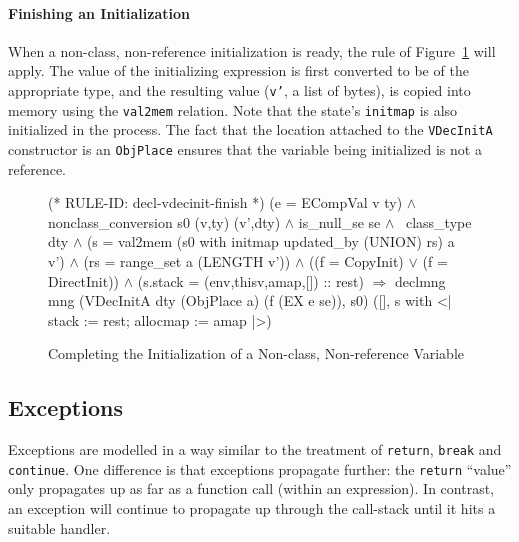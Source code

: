 \documentclass[11pt]{article}
\begin{document}
\paragraph{Finishing an Initialization}
When a non-class, non-reference initialization is ready, the rule
 of Figure~\ref{fig:decl-vdecinit-finish}
will apply.  The value of the initializing expression is first
converted to be of the appropriate type, and the resulting value
(\texttt{v'}, a list of bytes), is copied into memory using the
\texttt{val2mem}%
%
relation.  Note that the state's \texttt{initmap} is also initialized
in the process.  The fact that the location attached to the
\texttt{VDecInitA} constructor is an \texttt{ObjPlace} ensures that
the variable being initialized is not a reference.%
%
\begin{figure}
%
%
\begin{stdrule}
(* RULE-ID: decl-vdecinit-finish *)
     (e = ECompVal v ty) \(\land\)
     nonclass_conversion s0 (v,ty) (v',dty) \(\land\)
     is_null_se se \(\land\)
     ~class_type dty \(\land\)
     (s = val2mem (s0 with initmap updated_by (UNION) rs) a v') \(\land\)
     (rs = range_set a (LENGTH v')) \(\land\)
     ((f = CopyInit) \(\lor\) (f = DirectInit)) \(\land\)
     (s.stack = (env,thisv,amap,[]) :: rest)
   \(\Rightarrow\)
     declmng mng
         (VDecInitA dty (ObjPlace a) (f (EX e se)), s0)
         ([], s with <| stack := rest; allocmap := amap |>)
\end{stdrule}
\caption[Finishing Initialization of a Non-class, Non-reference
  Variable]{Completing the Initialization of a Non-class, Non-reference
  Variable}
\label{fig:decl-vdecinit-finish}
\end{figure}

\subsection{Exceptions}
\label{sec:exceptions}
\newcommand{\ethrow}{\texttt{EThrow}}

Exceptions are modelled in a way similar to the treatment of
\texttt{return}, \texttt{break} and \texttt{continue}.  One difference
is that exceptions propagate further: the \texttt{return} ``value''
only propagates up as far as a function call (within an expression).
In contrast, an exception will continue to propagate up through the
call-stack until it hits a suitable handler.
\end{document}
